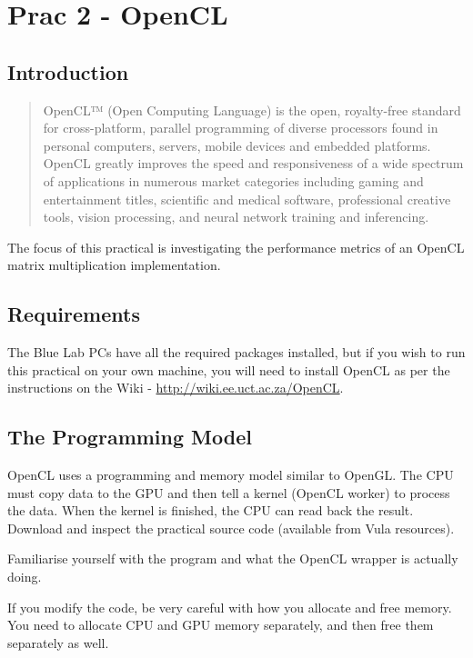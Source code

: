 \newpage
\section{Prac 2 - OpenCL}
\label{sec:Prac2}

\subsection{Introduction}
\begin{quote}
    OpenCL™ (Open Computing Language) is the open, royalty-free standard for cross-platform, parallel programming of diverse processors found in personal computers, servers, mobile devices and embedded platforms. OpenCL greatly improves the speed and responsiveness of a wide spectrum of applications in numerous market categories including gaming and entertainment titles, scientific and medical software, professional creative tools, vision processing, and neural network training and inferencing. \cite{opencl_khronos}
\end{quote}

The focus of this practical is investigating the performance metrics of an OpenCL matrix multiplication implementation.

\subsection{Requirements}
The Blue Lab PCs have all the required packages installed, but if you wish to run this practical on your own machine, you will need to install OpenCL as per the instructions on the Wiki - \href{http://wiki.ee.uct.ac.za/OpenCL}{http://wiki.ee.uct.ac.za/OpenCL}.

\subsection{The Programming Model}
OpenCL uses a programming and memory model similar to OpenGL. The CPU must copy data to the GPU and then tell a kernel (OpenCL worker) to process the data. When the kernel is finished, the CPU can read back the result. Download and inspect the practical source code (available from Vula resources).

Familiarise yourself with the program and what the OpenCL wrapper is actually doing. 

If you modify the code, be very careful with how you allocate and free memory. You need to allocate CPU and GPU memory separately, and then free them separately as well.

